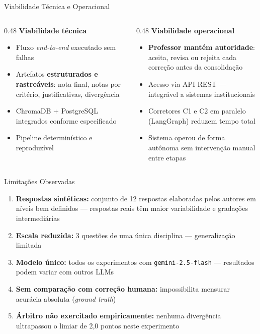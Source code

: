 \documentclass[10pt,aspectratio=169]{beamer}
\begin{document}
\begin{frame}{Viabilidade Técnica e Operacional}
  \begin{columns}[T]
    \begin{column}{0.48\textwidth}
      \textbf{Viabilidade técnica}
      \begin{itemize}
        \item Fluxo \textit{end-to-end} executado sem falhas
        \item Artefatos \textbf{estruturados e rastreáveis}: nota final, notas por critério, justificativas, divergência
        \item ChromaDB + PostgreSQL integrados conforme especificado
        \item Pipeline determinístico e reproduzível
      \end{itemize}
    \end{column}
    \begin{column}{0.48\textwidth}
      \textbf{Viabilidade operacional}
      \begin{itemize}
        \item \textbf{Professor mantém autoridade}: aceita, revisa ou rejeita cada correção antes da consolidação
        \item Acesso via API REST — integrável a sistemas institucionais
        \item Corretores C1 e C2 em paralelo (LangGraph) reduzem tempo total
        \item Sistema operou de forma autônoma sem intervenção manual entre etapas
      \end{itemize}
    \end{column}
  \end{columns}
\end{frame}

\begin{frame}{Limitações Observadas}
  \begin{enumerate}
    \item \textbf{Respostas sintéticas:} conjunto de 12 respostas elaboradas pelos autores em níveis bem definidos — respostas reais têm maior variabilidade e gradações intermediárias
    \item \textbf{Escala reduzida:} 3 questões de uma única disciplina --- generalização limitada
    \item \textbf{Modelo único:} todos os experimentos com \texttt{gemini-2.5-flash} --- resultados podem variar com outros LLMs
    \item \textbf{Sem comparação com correção humana:} impossibilita mensurar acurácia absoluta (\textit{ground truth})
    \item \textbf{Árbitro não exercitado empiricamente:} nenhuma divergência ultrapassou o limiar de 2,0 pontos neste experimento
  \end{enumerate}
\end{frame}
\end{document}
